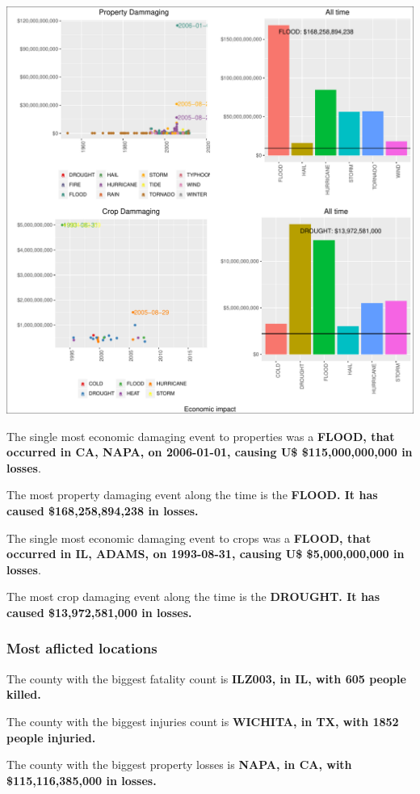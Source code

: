 \documentclass[]{article}
\begin{document}
\includegraphics{readme_files/figure-latex/economic-plot-1.pdf}

The single most economic damaging event to properties was a
\textbf{FLOOD, that occurred in CA, NAPA, on 2006-01-01, causing U\$
\$115,000,000,000 in losses}.

The most property damaging event along the time is the \textbf{FLOOD. It
has caused \$168,258,894,238 in losses.}

The single most economic damaging event to crops was a \textbf{FLOOD,
that occurred in IL, ADAMS, on 1993-08-31, causing U\$ \$5,000,000,000
in losses}.

The most crop damaging event along the time is the \textbf{DROUGHT. It
has caused \$13,972,581,000 in losses.}

\subsubsection{Most aflicted locations}\label{most-aflicted-locations-1}

The county with the biggest fatality count is \textbf{ILZ003, in IL,
with 605 people killed.}

The county with the biggest injuries count is \textbf{WICHITA, in TX,
with 1852 people injuried.}

The county with the biggest property losses is \textbf{NAPA, in CA, with
\$115,116,385,000 in losses.}
\end{document}

